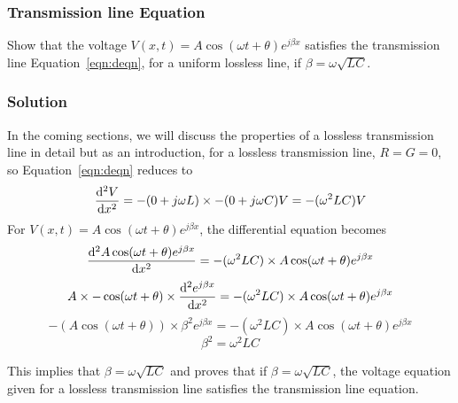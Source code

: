 \begin{exmp}
\subsubsection*{Transmission line Equation}
Show that the voltage $V(x,t) = A\cos(\omega t+\theta)e^{j\beta x}$ satisfies the transmission line Equation~\eqref{eqn:deqn}, for a uniform lossless line, if $\beta = \omega\sqrt{LC}$.

\subsubsection*{Solution}
In the coming sections, we will discuss the properties of a lossless transmission line in detail but as an introduction, for a lossless transmission line, $R = G = 0$, so Equation~\eqref{eqn:deqn} reduces to
\begin{dmath*}
\derivative[2]{V}{x} = -(0 + j\omega L)\times -(0 + j\omega C)V
= -(\omega^2 LC)V
\end{dmath*}
For $V(x,t) = A\cos(\omega t+\theta)e^{j\beta x}$, the differential equation becomes
\begin{dmath*}
\derivative[2]{A\cos(\omega t+\theta)e^{j\beta x}}{x} = -(\omega^2 LC)\times A\cos(\omega t+\theta)e^{j\beta x}
\end{dmath*}
\begin{dmath*}
A\times -\cos(\omega t+\theta)\times\derivative[2]{e^{j\beta x}}{x} = -(\omega^2 LC)\times A\cos(\omega t+\theta)e^{j\beta x}
\end{dmath*}
\begin{dmath*}
-(A\cos(\omega t+\theta))\times\beta^2e^{j\beta x} = -(\omega^2 LC)\times A\cos(\omega t+\theta)e^{j\beta x}
\end{dmath*}
\begin{dmath*}
\beta^2 = \omega^2 LC
\end{dmath*}

This implies that $\beta = \omega\sqrt{LC}$ and proves that if $\beta = \omega\sqrt{LC}$, the voltage equation given for a lossless transmission line satisfies the transmission line equation.
\end{exmp}

